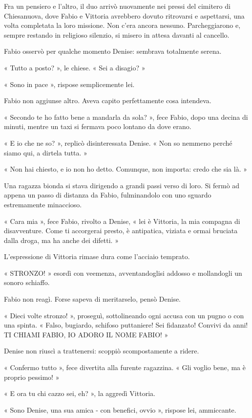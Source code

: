 Fra un pensiero e l'altro, il duo arrivò nuovamente nei pressi del cimitero di Chiesanuova, dove Fabio e Vittoria avrebbero dovuto ritrovarsi e aspettarsi, una volta completata la loro missione. Non c'era ancora nessuno. Parcheggiarono e, sempre restando in religioso silenzio, si misero in attesa davanti al cancello.

Fabio osservò per qualche momento Denise: sembrava totalmente serena.

« Tutto a posto? », le chiese. « Sei a disagio? »

« Sono in pace », rispose semplicemente lei.

Fabio non aggiunse altro. Aveva capito perfettamente cosa intendeva.

« Secondo te ho fatto bene a mandarla da sola? », fece Fabio, dopo una decina di minuti, mentre un taxi si fermava poco lontano da dove erano.

« E io che ne so? », replicò disinteressata Denise. « Non so nemmeno perché siamo qui, a dirtela tutta. »

« Non hai chiesto, e io non ho detto. Comunque, non importa: credo che sia là. »

Una ragazza bionda si stava dirigendo a grandi passi verso di loro. Si fermò ad appena un passo di distanza da Fabio, fulminandolo con uno sguardo estremamente minaccioso.

« Cara mia », fece Fabio, rivolto a Denise, « lei è Vittoria, la mia compagna di disavventure. Come ti accorgerai presto, è antipatica, viziata e ormai bruciata dalla droga, ma ha anche dei difetti. »

L'espressione di Vittoria rimase dura come l'acciaio temprato.

« STRONZO! » esordì con veemenza, avventandoglisi addosso e mollandogli un sonoro schiaffo.

Fabio non reagì. Forse sapeva di meritarselo, pensò Denise.

« Dieci volte stronzo! », proseguì, sottolineando ogni accusa con un pugno o con una spinta. « Falso, bugiardo, schifoso puttaniere! Sei fidanzato! Convivi da anni! TI CHIAMI FABIO, IO ADORO IL NOME FABIO! »

Denise non riuscì a trattenersi: scoppiò scompostamente a ridere.

« Confermo tutto », fece divertita alla furente ragazzina. « Gli voglio bene, ma è proprio pessimo! »

« E ora tu chi cazzo sei, eh? », la aggredì Vittoria.

« Sono Denise, una sua amica - con benefici, ovvio », rispose lei, ammiccante.

